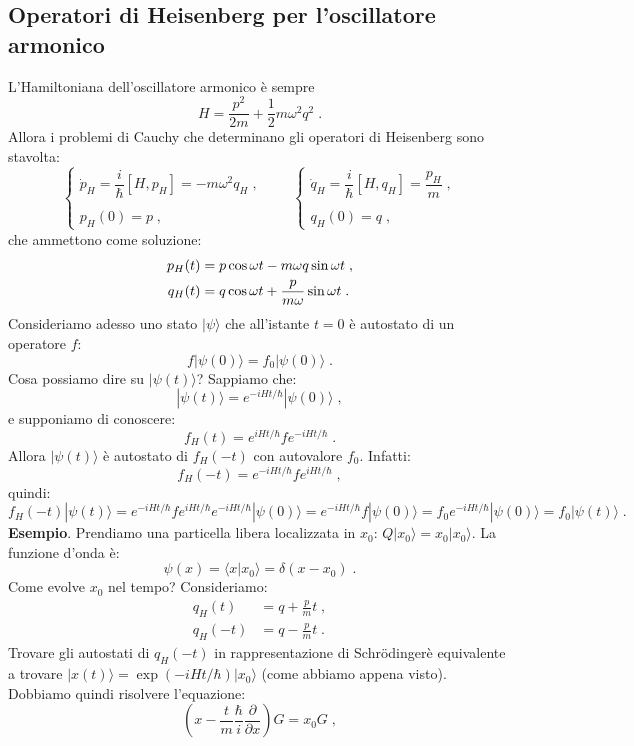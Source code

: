 \documentclass[12pt,a4paper]{report}
\theoremstyle{definition}
\numberwithin{equation}{section}
\newcommand{\bra}{\langle}
\newcommand{\ket}{\rangle}
\newcommand{\Sch}{Schrödinger}
\begin{document}
\subsection{Operatori di Heisenberg per l'oscillatore armonico}
L'Hamiltoniana dell'oscillatore armonico è sempre
$$
H=\frac{p^2}{2m}+\frac{1}{2}m\omega^2 q^2\;.
$$
Allora i problemi di Cauchy che determinano gli operatori di Heisenberg sono stavolta:
\begin{equation}
\begin{cases}
\dot{p}_H=\dfrac{i}{\hbar}[H,p_H]=-m\omega^2q_H\;, \\
\\
p_H(0)=p\;,
\end{cases} \qquad
\begin{cases}
\dot{q}_H=\dfrac{i}{\hbar}[H,q_H]=\dfrac{p_H}{m}\;, \\
\\
q_H(0)=q\;,
\end{cases}
\end{equation}
che ammettono come soluzione:
\begin{align}
p_H(t) &= p\cos\omega t-m\omega q\sin\omega t \notag\;, \\
q_H(t) &= q\cos\omega t+\frac{p}{m\omega}\sin\omega t\;.
\end{align}
Consideriamo adesso uno stato $|\psi\ket$ che all'istante $t=0$ è autostato di un operatore $f$:
$$
f|\psi(0)\ket=f_0|\psi(0)\ket\;.
$$
Cosa possiamo dire su $|\psi(t)\ket$? Sappiamo che:
$$
|\psi(t)\ket=e^{-iHt/\hbar}|\psi(0)\ket\;,
$$
e supponiamo di conoscere:
$$
f_H(t)=e^{iHt/\hbar}fe^{-iHt/\hbar}\;.
$$
Allora $|\psi(t)\ket$ è autostato di $f_H(-t)$ con autovalore $f_0$. Infatti:
$$
f_H(-t)=e^{-iHt/\hbar}fe^{iHt/\hbar}\;,
$$
quindi:
$$
f_H(-t)|\psi(t)\ket=e^{-iHt/\hbar}fe^{iHt/\hbar}e^{-iHt/\hbar}|\psi(0)\ket=e^{-iHt/\hbar}f|\psi(0)\ket=f_0e^{-iHt/\hbar}|\psi(0)\ket=f_0|\psi(t)\ket\;.
$$
\textbf{Esempio}. Prendiamo una particella libera localizzata in $x_0$: $Q|x_0\ket=x_0|x_0\ket$. La funzione d'onda è:
$$
\psi(x)=\bra x|x_0\ket=\delta(x-x_0)\;.
$$
Come evolve $x_0$ nel tempo? Consideriamo:
\begin{align*}
q_H(t)&=q+\frac{p}{m}t\;, \\
q_H(-t)&= q-\frac{p}{m}t\;.
\end{align*}
Trovare gli autostati di $q_H(-t)$ in rappresentazione di \Sch\;è equivalente a trovare $|x(t)\ket=\exp(-iHt/\hbar)|x_0\ket$ (come abbiamo appena visto). Dobbiamo quindi risolvere l'equazione:
\begin{equation}
\left(x-\frac{t}{m}\frac{\hbar}{i}\frac{\partial}{\partial x}\right)G=x_0G\;,
\end{equation}
\end{document}
